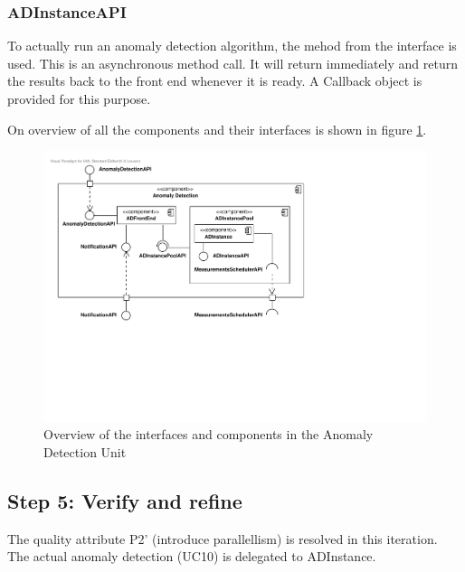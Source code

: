 \subsubsection{ADInstanceAPI}

\npar To actually run an anomaly detection algorithm, the mehod
 from the 
interface is used. This is an asynchronous method call. It will return
immediately and return the results back to the front end whenever it is ready.
A Callback object is provided for this purpose. 

\npar On overview of all the components and their interfaces is shown in figure
\ref{fig:it6/interfaces}.

\begin{figure}[H]
	\begin{centering}
		\includegraphics[width=\textwidth]{figs/add-it6-interfaces.pdf}
		\caption{Overview of the interfaces and components in the Anomaly Detection
		Unit}
		\label{fig:it6/interfaces}
	\end{centering}
\end{figure}

\subsection{Step 5: Verify and refine}
\label{add:it6/verification}

\npar The quality attribute P2' (introduce parallellism) is resolved in this
iteration. The actual anomaly detection (UC10) is delegated to ADInstance.
